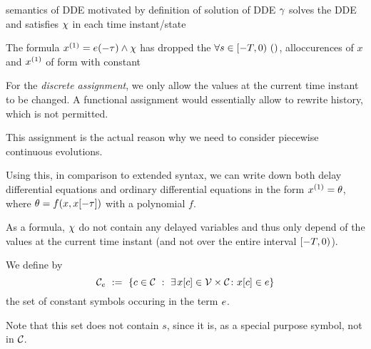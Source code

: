 \begin{definition}
\begin{enumerate}
        \end{enumerate}
    \end{definition}

    semantics of DDE motivated by definition of solution of DDE
    $\trajectory$ solves the DDE and satisfies $\ivr$ in each time instant/state

    The formula $\hevolve{\D{x}=\astrm(-\tau)}\land\ivr$ has dropped the $\holdssince{T}{}$, alloccurences of $x$ and $\D{x}$ of form with constant


    For the \emph{discrete assignment}, we only allow the values at the current time instant to be changed. A functional assignment would essentially allow to rewrite history, which is not permitted.

    This assignment is the actual reason why we need to consider piecewise continuous evolutions.


    Using this, in comparison to \dL extended syntax, we can write down both delay differential equations and ordinary differential equations in the form $\D{x}=\theta$, where $\theta=f(x,\xtau)$ with a polynomial $f$.

    
    As a \FOLR formula, $\ivr$ do not contain any delayed variables and thus only depend of the values at the current time instant (and not over the entire interval $\delayinterval$).

    \begin{definition}\label{def:termvars}
        We define by
        \begin{equation*}
            \constants[\astrm] \defeq \set{c\in\constants \with \mexists{\xtau[c]\in\delayvars}\holds\xtau[c]\in\astrm}
        \end{equation*}
        the set of constant symbols occuring in the term $\astrm$.

        Note that this set does not contain $s$, since it is, as a special purpose symbol, not in $\constants$.
    \end{definition}

